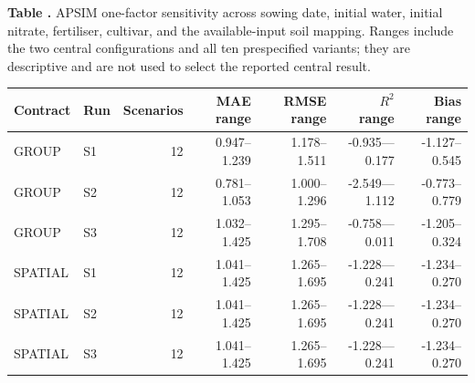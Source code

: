 \begin{table}[tb]
\centering
{}
\parbox{.96\textwidth}{\centering\textbf{Table \thetable.} APSIM one-factor sensitivity across sowing date, initial water, initial nitrate, fertiliser, cultivar, and the available-input soil mapping. Ranges include the two central configurations and all ten prespecified variants; they are descriptive and are not used to select the reported central result.}\par\medskip
\label{tab:apsim-sensitivity}
\small
\setlength{\tabcolsep}{3pt}
\begin{tabular}{llrrrrr}
\toprule
Contract & Run & Scenarios & MAE range & RMSE range & $R^2$ range & Bias range\\
\midrule
GROUP & S1 & 12 & 0.947--1.239 & 1.178--1.511 & -0.935---0.177 & -1.127--0.545\\
GROUP & S2 & 12 & 0.781--1.053 & 1.000--1.296 & -2.549---1.112 & -0.773--0.779\\
GROUP & S3 & 12 & 1.032--1.425 & 1.295--1.708 & -0.758---0.011 & -1.205--0.324\\
SPATIAL & S1 & 12 & 1.041--1.425 & 1.265--1.695 & -1.228---0.241 & -1.234--0.270\\
SPATIAL & S2 & 12 & 1.041--1.425 & 1.265--1.695 & -1.228---0.241 & -1.234--0.270\\
SPATIAL & S3 & 12 & 1.041--1.425 & 1.265--1.695 & -1.228---0.241 & -1.234--0.270\\
\bottomrule
\end{tabular}
\end{table}
